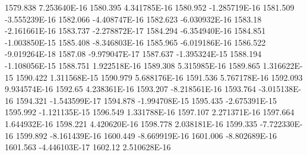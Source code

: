 1579.838  7.253640E-16
1580.395  4.341785E-16
1580.952  -1.285719E-16
1581.509  -3.555239E-16
1582.066  -4.408747E-16
1582.623  -6.030932E-16
1583.18  -2.161661E-16
1583.737  -2.278872E-17
1584.294  -6.354940E-16
1584.851  -1.003850E-15
1585.408  -8.346803E-16
1585.965  -6.019186E-16
1586.522  -9.019264E-18
1587.08  -9.979047E-17
1587.637  -1.395324E-15
1588.194  -1.108056E-15
1588.751  1.922518E-16
1589.308  5.315985E-16
1589.865  1.316622E-15
1590.422  1.311568E-15
1590.979  5.688176E-16
1591.536  5.767178E-16
1592.093  9.934574E-16
1592.65  4.238361E-16
1593.207  -8.218561E-16
1593.764  -3.015138E-16
1594.321  -1.543599E-17
1594.878  -1.994708E-15
1595.435  -2.675391E-15
1595.992  -1.121135E-15
1596.549  1.331788E-16
1597.107  2.271371E-16
1597.664  1.644932E-16
1598.221  4.420620E-16
1598.778  2.038181E-16
1599.335  -7.722330E-16
1599.892  -8.161439E-16
1600.449  -8.669919E-16
1601.006  -8.802689E-16
1601.563  -4.446103E-17
1602.12  2.510628E-16
